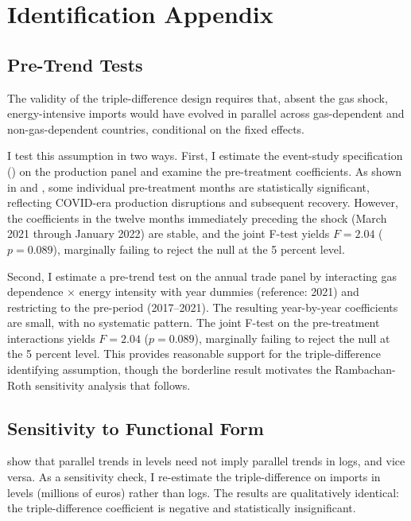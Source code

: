 \documentclass[12pt]{article}
\begin{document}
\section{Identification Appendix}
\label{app:identification}

\subsection{Pre-Trend Tests}

The validity of the triple-difference design requires that, absent the gas shock, energy-intensive imports would have evolved in parallel across gas-dependent and non-gas-dependent countries, conditional on the fixed effects.

I test this assumption in two ways. First, I estimate the event-study specification () on the production panel and examine the pre-treatment coefficients. As shown in  and , some individual pre-treatment months are statistically significant, reflecting COVID-era production disruptions and subsequent recovery. However, the coefficients in the twelve months immediately preceding the shock (March 2021 through January 2022) are stable, and the joint F-test yields $F = 2.04$ ($p = 0.089$), marginally failing to reject the null at the 5 percent level.

Second, I estimate a pre-trend test on the annual trade panel by interacting gas dependence $\times$ energy intensity with year dummies (reference: 2021) and restricting to the pre-period (2017--2021). The resulting year-by-year coefficients are small, with no systematic pattern. The joint F-test on the pre-treatment interactions yields $F = 2.04$ ($p = 0.089$), marginally failing to reject the null at the 5 percent level. This provides reasonable support for the triple-difference identifying assumption, though the borderline result motivates the Rambachan-Roth sensitivity analysis that follows.

\subsection{Sensitivity to Functional Form}

\citet{roth2023pretrends} show that parallel trends in levels need not imply parallel trends in logs, and vice versa. As a sensitivity check, I re-estimate the triple-difference on imports in levels (millions of euros) rather than logs. The results are qualitatively identical: the triple-difference coefficient is negative and statistically insignificant.
\end{document}
